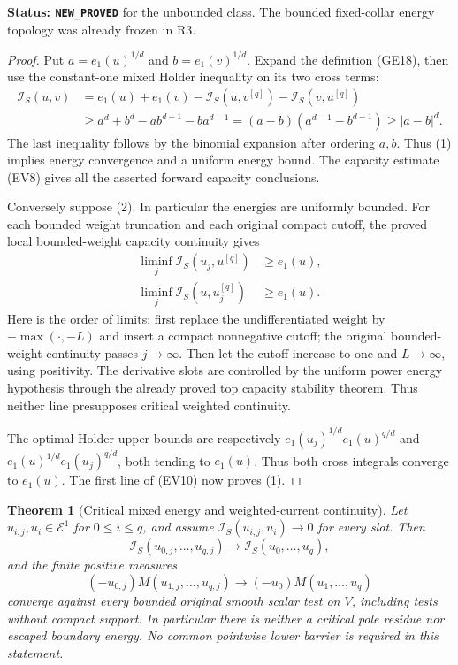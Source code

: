 \documentclass[11pt,a4paper]{article}
\numberwithin{equation}{section}
\newtheorem{theorem}{Theorem}[section]
\theoremstyle{definition}
\theoremstyle{remark}
\begin{document}
\noindent\textbf{Status: \texttt{NEW\_PROVED}} for the
unbounded class. The bounded fixed-collar energy topology
was already frozen in R3.

\begin{proof}
Put $a=e_1(u)^{1/d}$ and $b=e_1(v)^{1/d}$.
Expand the definition (GE18), then use the constant-one
mixed Holder inequality on its two cross terms:
\[
 \begin{split}
 \mathscr I_S(u,v)
 &=e_1(u)+e_1(v)
       -\mathcal I_S(u,v^{[q]})-\mathcal I_S(v,u^{[q]})\\
 &\geq a^d+b^d-ab^{d-1}-ba^{d-1}
       =(a-b)(a^{d-1}-b^{d-1})\geq|a-b|^d.
 \end{split}
 \tag{EV10}
\]
The last inequality follows by the binomial expansion after
ordering $a,b$. Thus (1) implies energy convergence and a
uniform energy bound. The capacity estimate (EV8) gives
all the asserted forward capacity conclusions.

Conversely suppose (2). In particular the energies are
uniformly bounded. For each bounded weight truncation and
each original compact cutoff, the proved local bounded-weight
capacity continuity gives
\[
 \begin{split}
 \liminf_j\mathcal I_S(u_j,u^{[q]})&\geq e_1(u),\\
 \liminf_j\mathcal I_S(u,u_j^{[q]})&\geq e_1(u).
 \end{split}
 \tag{EV11}
\]
Here is the order of limits: first replace the
undifferentiated weight by $-\max(\cdot,-L)$ and insert a
compact nonnegative cutoff; the original bounded-weight
continuity passes $j\to\infty$. Then let the cutoff
increase to one and $L\to\infty$, using positivity.
The derivative slots are controlled by the uniform power
energy hypothesis through the already proved top capacity
stability theorem. Thus neither line presupposes critical
weighted continuity.

The optimal Holder upper bounds are respectively
$e_1(u_j)^{1/d}e_1(u)^{q/d}$ and
$e_1(u)^{1/d}e_1(u_j)^{q/d}$, both tending to $e_1(u)$.
Thus both cross integrals converge to $e_1(u)$.
The first line of (EV10) now proves (1).
\end{proof}

\begin{theorem}[Critical mixed energy and weighted-current continuity]
\label{thm:r11-strong-critical-mixed-continuity}
Let $u_{i,j},u_i\in\mathcal E^1$ for $0\leq i\leq q$,
and assume $\mathscr I_S(u_{i,j},u_i)\to0$ for every slot.
Then
\[
 \mathcal I_S(u_{0,j},\ldots,u_{q,j})
                  \longrightarrow\mathcal I_S(u_0,\ldots,u_q),
 \tag{EV12}
\]
and the finite positive measures
\[
 (-u_{0,j})M(u_{1,j},\ldots,u_{q,j})
                      \longrightarrow(-u_0)M(u_1,\ldots,u_q)
 \tag{EV13}
\]
converge against every bounded original smooth scalar test
on $V$, including tests without compact support. In
particular there is neither a critical pole residue nor
escaped boundary energy. No common pointwise lower barrier
is required in this statement.
\end{theorem}
\end{document}
